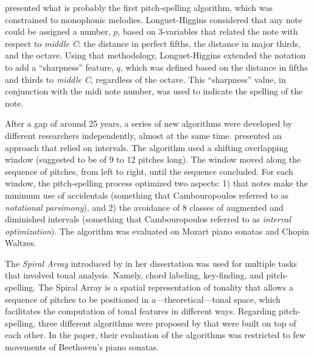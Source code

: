 

\textcite{longuethiggins1976perception} presented what is
probably the first pitch-spelling algorithm, which was
constrained to monophonic melodies. Longuet-Higgins
considered that any note could be assigned a number, $p$,
based on 3-variables that related the note with respect to
\emph{middle C}: the distance in perfect fifths, the
distance in major thirds, and the octave. Using that
methodology, Longuet-Higgins extended the notation to add a
``sharpness'' feature, $q$, which was defined based on the
distance in fifths and thirds to \emph{middle C}, regardless
of the octave. This ``sharpness'' value, in conjunction with
the \gls{midi} note number, was used to indicate the
spelling of the note.

After a gap of around 25 years, a series of new algorithms
were developed by different researchers independently,
almost at the same time. \textcite{cambouropoulos2003pitch}
presented an approach that relied on intervals. The
algorithm used a shifting overlapping window (suggested to
be of 9 to 12 pitches long). The window moved along the
sequence of pitches, from left to right, until the sequence
concluded. For each window, the pitch-spelling process
optimized two aspects: 1) that notes make the minimum use of
accidentals (something that Cambouropoulos referred to as
\emph{notational parsimony}), and 2) the avoidance of 8
classes of augmented and diminished intervals (something
that Cambouropoulos referred to as \emph{interval
optimization}). The algorithm was evaluated on Mozart piano
sonatas and Chopin Waltzes.

The \emph{Spiral Array} introduced by
\textcite{chew2000towards} in her dissertation was used for
multiple tasks that involved tonal analysis. Namely, chord
labeling, key-finding, and pitch-spelling. The Spiral Array
is a spatial representation of tonality that allows a
sequence of pitches to be positioned in
a---theoretical---tonal space, which facilitates the
computation of tonal features in different ways. Regarding
pitch-spelling, three different algorithms were proposed by
\textcite{chew2003determining} that were built on top of
each other. In the paper, their evaluation of the algorithms
was restricted to few movements of Beethoven's piano
sonatas.

